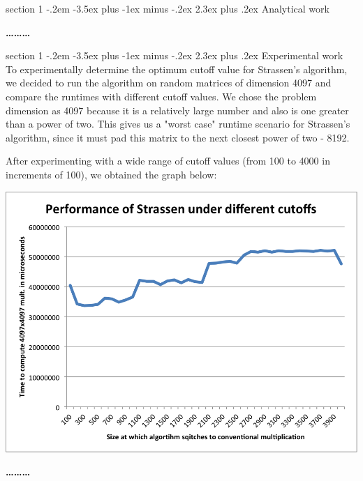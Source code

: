 \documentclass[12pt]{article}
\makeatletter
\newenvironment{problem}{\@startsection
       {section}
       {1}
       {-.2em}
       {-3.5ex plus -1ex minus -.2ex}
       {2.3ex plus .2ex}
       {\pagebreak[3]%
       \large\bf\noindent{Problem }
       }
       }
       {%
       \begin{center}\large\bf \ldots\ldots\ldots\end{center}}
\makeatother
\begin{document}
\begin{problem}{}
Analytical work\\

\end{problem}{}
\begin{problem}{}
Experimental work\\

To experimentally determine the optimum cutoff value for Strassen's algorithm, we decided to run the algorithm on random matrices of dimension 4097 and compare the runtimes with different cutoff values.  We chose the problem dimension as 4097 because it is a relatively large number and also is one greater than a power of two.  This gives us a "worst case" runtime scenario for Strassen's algorithm, since it must pad this matrix to the next closest power of two - 8192.

After experimenting with a wide range of cutoff values (from 100 to 4000 in increments of 100), we obtained the graph below:
\begin{center}
\includegraphics[scale=0.8]{figs/benchmark-1.png}
\end{center}


\end{problem}
\end{document}
